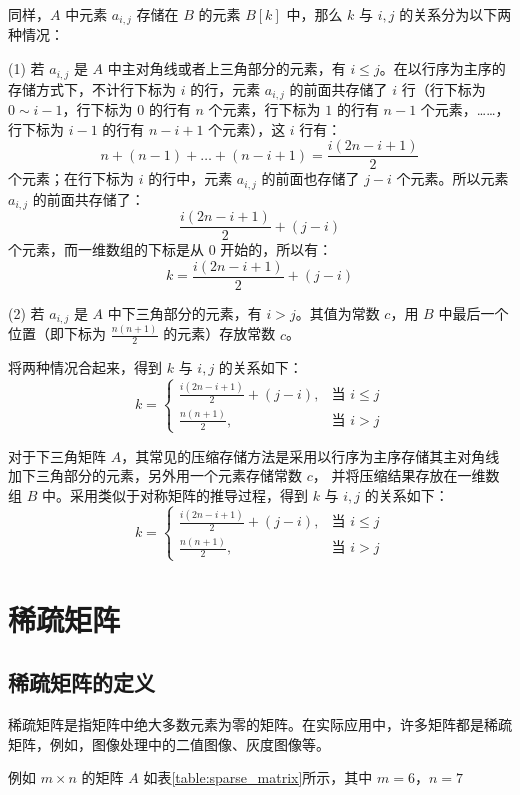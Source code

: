 \documentclass[lang=cn,newtx,10pt,scheme=chinese]{elegantbook}
\begin{document}
同样，$A$ 中元素 $a_{i,j}$ 存储在 $B$ 的元素 $B[k]$ 中，那么 $k$ 与 $i,j$ 的关系分为以下两种情况：

(1) 若 $a_{i,j}$ 是 $A$ 中主对角线或者上三角部分的元素，有 $i \leq j$。在以行序为主序的存储方式下，不计行下标为 $i$ 的行，元素 $a_{i,j}$ 的前面共存储了 $i$ 行（行下标为 $0 \sim i-1$，行下标为 $0$ 的行有 $n$ 个元素，行下标为 $1$ 的行有 $n-1$ 个元素，……，行下标为 $i-1$ 的行有 $n-i+1$ 个元素），这 $i$ 行有：
\[
n + (n-1) + \dots + (n-i+1) = \frac{i(2n-i+1)}{2}
\]
个元素；在行下标为 $i$ 的行中，元素 $a_{i,j}$ 的前面也存储了 $j-i$ 个元素。所以元素 $a_{i,j}$ 的前面共存储了：
\[
\frac{i(2n-i+1)}{2} + (j-i)
\]
个元素，而一维数组的下标是从 $0$ 开始的，所以有：
\[
k = \frac{i(2n-i+1)}{2} + (j-i)
\]

(2) 若 $a_{i,j}$ 是 $A$ 中下三角部分的元素，有 $i > j$。其值为常数 $c$，用 $B$ 中最后一个位置（即下标为 $\frac{n(n+1)}{2}$ 的元素）存放常数 $c$。

将两种情况合起来，得到 $k$ 与 $i,j$ 的关系如下：
\[
k =
\begin{cases} 
\frac{i(2n-i+1)}{2} + (j-i), & \text{当 } i \leq j \\ 
\frac{n(n+1)}{2}, & \text{当 } i > j
\end{cases}
\]

对于下三角矩阵 $A$，其常见的压缩存储方法是采用以行序为主序存储其主对角线加下三角部分的元素，另外用一个元素存储常数 $c$，
并将压缩结果存放在一维数组 $B$ 中。采用类似于对称矩阵的推导过程，得到 $k$ 与 $i,j$ 的关系如下：
\[
k =
\begin{cases} 
\frac{i(2n-i+1)}{2} + (j-i), & \text{当 } i \leq j \\ 
\frac{n(n+1)}{2}, & \text{当 } i > j
\end{cases}
\]
\section{稀疏矩阵}



\subsection{稀疏矩阵的定义}

稀疏矩阵是指矩阵中绝大多数元素为零的矩阵。在实际应用中，许多矩阵都是稀疏矩阵，例如，图像处理中的二值图像、灰度图像等。

例如 $m \times n$ 的矩阵 $A$ 如表\ref{table:sparse_matrix}所示，其中 $m = 6$，$n = 7$
\end{document}
